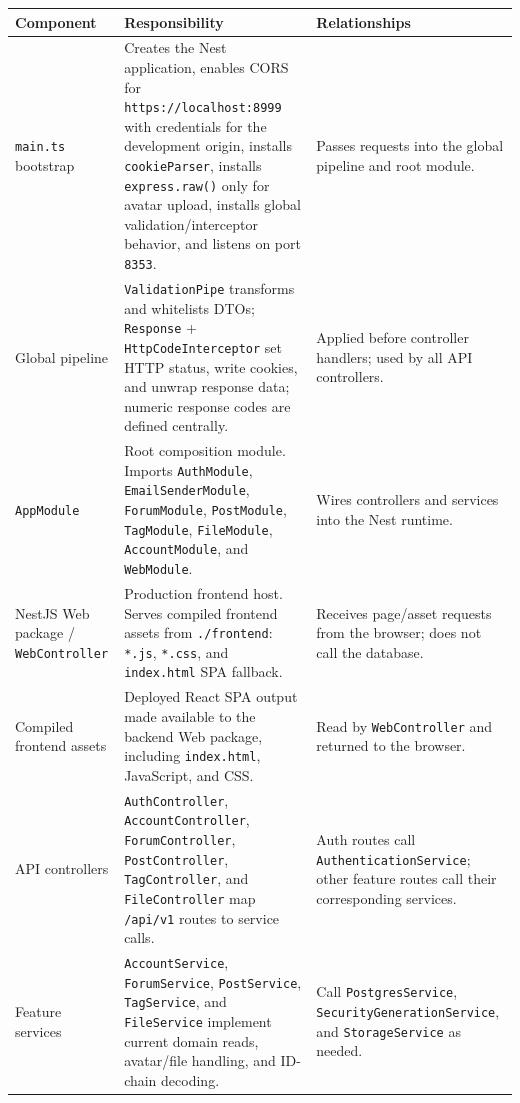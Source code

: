 \documentclass[12pt]{article}
\renewcommand{\baselinestretch}{1.5}
\begin{document}
\begingroup
\small
\renewcommand{\baselinestretch}{1.0}\selectfont
\renewcommand{\arraystretch}{1.15}
\setlength{\tabcolsep}{6pt}
\begin{longtable}{|>{\raggedright\arraybackslash}p{}|>{\raggedright\arraybackslash}p{}|>{\raggedright\arraybackslash}p{}|}
\hline
\textbf{Component} & \textbf{Responsibility} & \textbf{Relationships} \\ \hline
\endhead
\texttt{main.ts} bootstrap & Creates the Nest application, enables CORS for \texttt{https://localhost:8999} with credentials for the development origin, installs \texttt{cookieParser}, installs \texttt{express.raw()} only for avatar upload, installs global validation/interceptor behavior, and listens on port \texttt{8353}. & Passes requests into the global pipeline and root module. \\ \hline
Global pipeline & \texttt{ValidationPipe} transforms and whitelists DTOs; \texttt{Response} + \texttt{HttpCodeInterceptor} set HTTP status, write cookies, and unwrap response data; numeric response codes are defined centrally. & Applied before controller handlers; used by all API controllers. \\ \hline
\texttt{AppModule} & Root composition module. Imports \texttt{AuthModule}, \texttt{EmailSenderModule}, \texttt{ForumModule}, \texttt{PostModule}, \texttt{TagModule}, \texttt{FileModule}, \texttt{AccountModule}, and \texttt{WebModule}. & Wires controllers and services into the Nest runtime. \\ \hline
NestJS Web package / \texttt{WebController} & Production frontend host. Serves compiled frontend assets from \texttt{./frontend}: \texttt{*.js}, \texttt{*.css}, and \texttt{index.html} SPA fallback. & Receives page/asset requests from the browser; does not call the database. \\ \hline
Compiled frontend assets & Deployed React SPA output made available to the backend Web package, including \texttt{index.html}, JavaScript, and CSS. & Read by \texttt{WebController} and returned to the browser. \\ \hline
API controllers & \texttt{AuthController}, \texttt{AccountController}, \texttt{ForumController}, \texttt{PostController}, \texttt{TagController}, and \texttt{FileController} map \texttt{/api/v1} routes to service calls. & Auth routes call \texttt{AuthenticationService}; other feature routes call their corresponding services. \\ \hline
Feature services & \texttt{AccountService}, \texttt{ForumService}, \texttt{PostService}, \texttt{TagService}, and \texttt{FileService} implement current domain reads, avatar/file handling, and ID-chain decoding. & Call \texttt{PostgresService}, \texttt{SecurityGenerationService}, and \texttt{StorageService} as needed. \\ \hline

\end{longtable}
\end{document}
